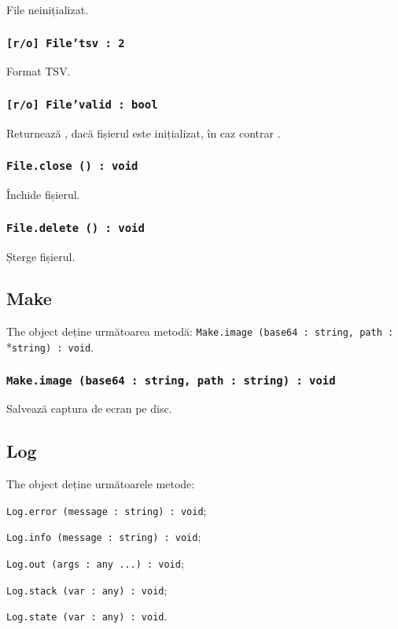 File neinițializat.

\subsubsection{\texttt{[r/o] File'tsv : 2}}

Format TSV.

\subsubsection{\texttt{[r/o] File'valid : bool}}

Returnează \true, dacă fișierul este inițializat, în caz contrar \false.

\subsubsection{\texttt{File.close () : void}}

Închide fișierul.

\subsubsection{\texttt{File.delete () : void}}

Șterge fișierul.

\subsection{{\color{orange} Make}}

The object \make{} deține următoarea metodă: \texttt{Make.image (base64 : string, path :}\\*\texttt{string) : void}.

\subsubsection{\texttt{Make.image (base64 : string, path : string) : void}}

Salvează captura de ecran pe disc.

\subsection{{\color{orange} Log}}

The object \logtype{} deține următoarele metode:
\begin{icItems}
	\item \texttt{Log.error (message : string) : void};
	\item \texttt{Log.info (message : string) : void};
	\item \texttt{Log.out (args : any ...) : void};
	\item \texttt{Log.stack (var : any) : void};
	\item \texttt{Log.state (var : any) : void}.
\end{icItems}

